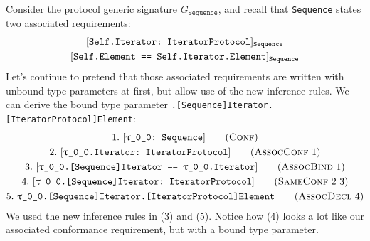 \documentclass[../generics]{subfiles}
\begin{document}
\begin{example}
Consider the protocol generic signature $G_\texttt{Sequence}$, and recall that \texttt{Sequence} states two associated requirements:
\begin{gather*}
\AssocConfReq{Self.Iterator}{IteratorProtocol}{Sequence}\\
\AssocSameReq{Self.Element}{Self.Iterator.Element}{Sequence}
\end{gather*}
Let's continue to pretend that those associated requirements are written with unbound type parameters at first, but allow use of the new inference rules. We can derive the bound type parameter \texttt{\rT.[Sequence]Iterator.[IteratorProtocol]Element}:
\begin{gather*}
\ConfStep{\rT}{Sequence}{1}\\
\AssocConfStep{1}{\rT.Iterator}{IteratorProtocol}{2}\\
\AssocBindStep{1}{\rT.[Sequence]Iterator}{\rT.Iterator}{3}\\
\SameConfStep{2}{3}{\rT.[Sequence]Iterator}{IteratorProtocol}{4}\\
\AssocDeclStep{4}{\rT.[Sequence]Iterator.[IteratorProtocol]Element}{5}
\end{gather*}
We used the new inference rules in (3) and (5). Notice how (4) looks a lot like our associated conformance requirement, but with a bound type parameter.


\end{example}
\end{document}

